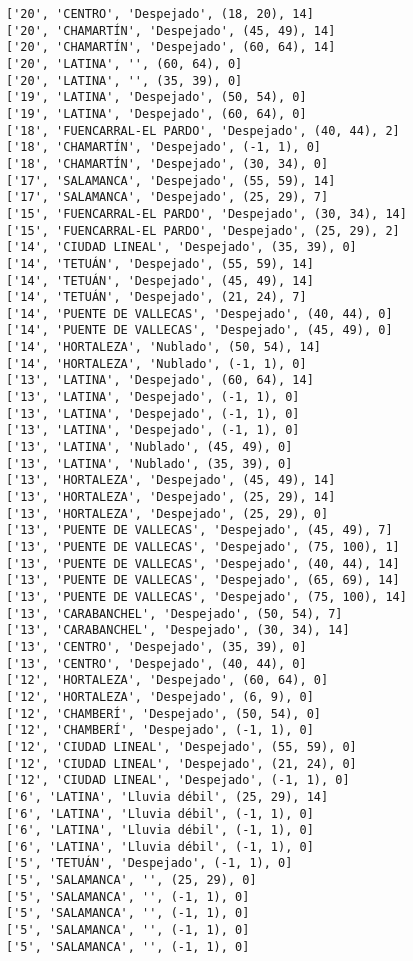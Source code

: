 \documentclass[11pt]{article}
\begin{document}
\begin{Verbatim}[commandchars=\\\{\}]
['20', 'CENTRO', 'Despejado', (18, 20), 14]
['20', 'CHAMARTÍN', 'Despejado', (45, 49), 14]
['20', 'CHAMARTÍN', 'Despejado', (60, 64), 14]
['20', 'LATINA', '', (60, 64), 0]
['20', 'LATINA', '', (35, 39), 0]
['19', 'LATINA', 'Despejado', (50, 54), 0]
['19', 'LATINA', 'Despejado', (60, 64), 0]
['18', 'FUENCARRAL-EL PARDO', 'Despejado', (40, 44), 2]
['18', 'CHAMARTÍN', 'Despejado', (-1, 1), 0]
['18', 'CHAMARTÍN', 'Despejado', (30, 34), 0]
['17', 'SALAMANCA', 'Despejado', (55, 59), 14]
['17', 'SALAMANCA', 'Despejado', (25, 29), 7]
['15', 'FUENCARRAL-EL PARDO', 'Despejado', (30, 34), 14]
['15', 'FUENCARRAL-EL PARDO', 'Despejado', (25, 29), 2]
['14', 'CIUDAD LINEAL', 'Despejado', (35, 39), 0]
['14', 'TETUÁN', 'Despejado', (55, 59), 14]
['14', 'TETUÁN', 'Despejado', (45, 49), 14]
['14', 'TETUÁN', 'Despejado', (21, 24), 7]
['14', 'PUENTE DE VALLECAS', 'Despejado', (40, 44), 0]
['14', 'PUENTE DE VALLECAS', 'Despejado', (45, 49), 0]
['14', 'HORTALEZA', 'Nublado', (50, 54), 14]
['14', 'HORTALEZA', 'Nublado', (-1, 1), 0]
['13', 'LATINA', 'Despejado', (60, 64), 14]
['13', 'LATINA', 'Despejado', (-1, 1), 0]
['13', 'LATINA', 'Despejado', (-1, 1), 0]
['13', 'LATINA', 'Despejado', (-1, 1), 0]
['13', 'LATINA', 'Nublado', (45, 49), 0]
['13', 'LATINA', 'Nublado', (35, 39), 0]
['13', 'HORTALEZA', 'Despejado', (45, 49), 14]
['13', 'HORTALEZA', 'Despejado', (25, 29), 14]
['13', 'HORTALEZA', 'Despejado', (25, 29), 0]
['13', 'PUENTE DE VALLECAS', 'Despejado', (45, 49), 7]
['13', 'PUENTE DE VALLECAS', 'Despejado', (75, 100), 1]
['13', 'PUENTE DE VALLECAS', 'Despejado', (40, 44), 14]
['13', 'PUENTE DE VALLECAS', 'Despejado', (65, 69), 14]
['13', 'PUENTE DE VALLECAS', 'Despejado', (75, 100), 14]
['13', 'CARABANCHEL', 'Despejado', (50, 54), 7]
['13', 'CARABANCHEL', 'Despejado', (30, 34), 14]
['13', 'CENTRO', 'Despejado', (35, 39), 0]
['13', 'CENTRO', 'Despejado', (40, 44), 0]
['12', 'HORTALEZA', 'Despejado', (60, 64), 0]
['12', 'HORTALEZA', 'Despejado', (6, 9), 0]
['12', 'CHAMBERÍ', 'Despejado', (50, 54), 0]
['12', 'CHAMBERÍ', 'Despejado', (-1, 1), 0]
['12', 'CIUDAD LINEAL', 'Despejado', (55, 59), 0]
['12', 'CIUDAD LINEAL', 'Despejado', (21, 24), 0]
['12', 'CIUDAD LINEAL', 'Despejado', (-1, 1), 0]
['6', 'LATINA', 'Lluvia débil', (25, 29), 14]
['6', 'LATINA', 'Lluvia débil', (-1, 1), 0]
['6', 'LATINA', 'Lluvia débil', (-1, 1), 0]
['6', 'LATINA', 'Lluvia débil', (-1, 1), 0]
['5', 'TETUÁN', 'Despejado', (-1, 1), 0]
['5', 'SALAMANCA', '', (25, 29), 0]
['5', 'SALAMANCA', '', (-1, 1), 0]
['5', 'SALAMANCA', '', (-1, 1), 0]
['5', 'SALAMANCA', '', (-1, 1), 0]
['5', 'SALAMANCA', '', (-1, 1), 0]

\end{Verbatim}
\end{document}
